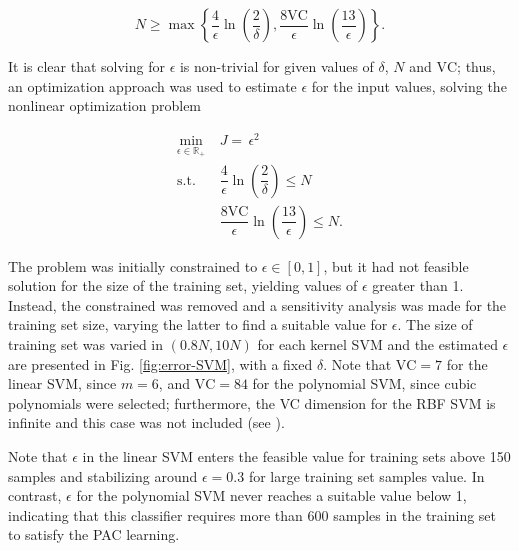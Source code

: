\documentclass[conference]{IEEEtran}
\theoremstyle{definition}
\theoremstyle{remark}
\theoremstyle{remark}
\begin{document}
\begin{equation}
N\geq \max\left\{ \dfrac{4}{\epsilon}\ln\left(\dfrac{2}{\delta}\right),
\dfrac{8\mathrm{VC}}{\epsilon}\ln\left(\dfrac{13}{\epsilon}\right) \right\}.
\end{equation}

It is clear that solving for $\epsilon$ is non-trivial for given values of
$\delta$, $N$ and $\mathrm{VC}$; thus, an optimization approach was used to
estimate $\epsilon$ for the input values, solving the nonlinear optimization
problem

\begin{equation}
\begin{split}
\min_{\epsilon\in\mathbb{R}_+}\ &J=\,\epsilon^2\\
\mathrm{s.t.}\ &\dfrac{4}{\epsilon}\ln\left(\dfrac{2}{\delta} \right)\leq N\\
\quad&\dfrac{8\mathrm{VC}}{\epsilon}\ln\left(\dfrac{13}{\epsilon}\right)\leq N.
\end{split}
\end{equation}

The problem was initially constrained to $\epsilon\in[0,1]$, but it had not
feasible solution for the size of the training set, yielding values of
$\epsilon$ greater than 1. Instead, the constrained was removed and a
sensitivity analysis was made for the training set size, varying the latter to
find a suitable value for $\epsilon$. The size of training set was varied in
$(0.8N, 10N)$ for each kernel SVM and the estimated $\epsilon$ are presented
in Fig. \ref{fig:error-SVM}, with a fixed $\delta$. Note that $\mathrm{VC}=7$
for the linear SVM, since
$m=6$, and $\mathrm{VC}=84$ for the polynomial SVM, since cubic polynomials were
selected; furthermore, the VC dimension for the RBF SVM is infinite and this
case was not included (see \parencite{burges1998}).

Note that $\epsilon$ in the linear SVM enters the feasible value for training
sets above 150 samples and stabilizing around $\epsilon=0.3$ for large training
set samples value. In contrast, $\epsilon$ for the polynomial SVM never reaches
a suitable value below 1, indicating that this classifier requires more than 600
samples in the training set to satisfy the PAC learning.
\end{document}
